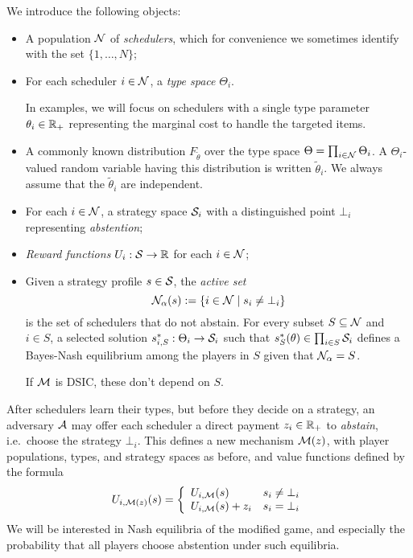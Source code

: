 We introduce the following objects:
%
\begin{itemize}
  \item 
    A population $\mathcal{N}$ of \emph{schedulers}, which for convenience we sometimes identify with the set $\{1,\ldots,N\}$;
  \item 
    For each scheduler $i\in\mathcal{N}$, a \emph{type space} $\Theta_i$.
    
    In examples, we will focus on schedulers with a single type parameter $\theta_i\in\mathbb{R}_+$ representing the marginal cost to handle the targeted items.
  \item
    A commonly known distribution $F_{\tilde\theta}$ over the type space $\Theta=\prod_{i\in\mathcal{N}}\Theta_i$.
    A $\Theta_i$-valued random variable having this distribution is written $\tilde\theta_i$.
    We always assume that the $\tilde\theta_i$ are independent.
  \item
    For each $i\in\mathcal{N}$, a strategy space $\mathcal{S}_i$ with a distinguished point $\bot_i$ representing \emph{abstention};
  \item
    \emph{Reward functions} $U_i:\mathcal{S} \rightarrow \mathbb{R}$ for each $i\in\mathcal{N}$;
  \item
    Given a strategy profile $s\in\mathcal{S}$, the \emph{active set} 
    \[
      \mathcal{N}_\alpha(s) := \{i\in\mathcal{N} \mid s_i \neq\bot_i\} 
    \] 
    is the set of schedulers that do not abstain.
    For every subset $S\subseteq\mathcal{N}$ and $i\in S$, a selected solution $s^*_{i,S}:\Theta_i\rightarrow\mathcal{S}_i$ such that $s_S^*(\theta)\in\prod_{i\in S}\mathcal{S}_i$ defines a Bayes-Nash equilibrium among the players in $S$ given that $\mathcal{N}_\alpha = S$.
    
    If $\mathcal{M}$ is DSIC, these don't depend on $S$.

\end{itemize}
%

After schedulers learn their types, but before they decide on a strategy, an adversary $\mathcal{A}$ may offer each scheduler a direct payment $z_i\in\mathbb{R}_+$ to \emph{abstain}, i.e.~choose the strategy $\bot_i$.
%
This defines a new mechanism $\mathcal{M}(z)$, with player populations, types, and strategy spaces as before, and value functions defined by the formula
%
\[
  U_{i,\mathcal{M}(z)}(s) = \left\{\begin{array}{ll} 
    U_{i,\mathcal{M}}(s) & s_i \neq \bot_i \\
    U_{i,\mathcal{M}}(s) + z_i & s_i = \bot_i
  \end{array}\right.
\]
%
We will be interested in Nash equilibria of the modified game, and especially the probability that all players choose abstention under such equilibria.



